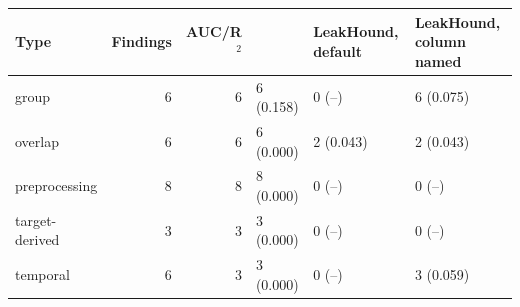 \begin{tabular}{@{}lrrlll@{}}
\toprule
\textbf{Type} & \textbf{Findings} & \textbf{AUC/R$^2$} & \textbf{\tool{}} & \textbf{LeakHound, default} & \textbf{LeakHound, column named} \\
\midrule
group & 6 & 6 & 6 (0.158) & 0 (--) & 6 (0.075) \\
overlap & 6 & 6 & 6 (0.000) & 2 (0.043) & 2 (0.043) \\
preprocessing & 8 & 8 & 8 (0.000) & 0 (--) & 0 (--) \\
target-derived & 3 & 3 & 3 (0.000) & 0 (--) & 0 (--) \\
temporal & 6 & 3 & 3 (0.000) & 0 (--) & 3 (0.059) \\
\bottomrule
\end{tabular}
